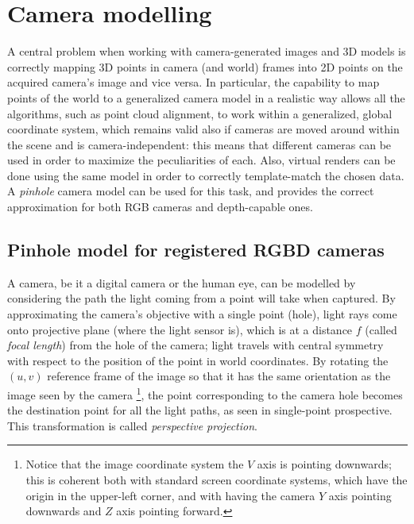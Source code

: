 \section{Camera modelling} \label{sec:camera_modelling}
A central problem when working with camera-generated images and 3D models is
correctly mapping 3D points in camera (and world) frames into 2D points on the
acquired camera's image and vice versa. In particular, the capability to map
points of the world to a generalized camera model in a realistic way allows all
the algorithms, such as point cloud alignment, to work within a generalized,
global coordinate system, which remains valid also if cameras are moved around
within the scene and is camera-independent: this means that different cameras
can be used in order to maximize the peculiarities of each. Also, virtual
renders can be done using the same model in order to correctly template-match
the chosen data.  A \emph{pinhole} camera model can be used for this task, and
provides the correct approximation for both RGB cameras and depth-capable ones.

\subsection{Pinhole model for registered RGBD cameras}\label{sec:intrinsics}
A camera, be it a digital camera or the human eye, can be modelled by
considering the path the light coming from a point will take when
captured. By approximating the camera's objective with a single point (hole),
light rays come onto projective plane (where the light sensor is), which is at a
distance $f$ (called \emph{focal length}) from the hole of the camera; light
travels with central
symmetry with respect to the position of the point in world coordinates. By
rotating the $(u,v)$ reference frame of the image so that it has the same
orientation as the image seen by the camera \footnote{Notice that the image
  coordinate system the $V$ axis is pointing downwards; this is coherent both
  with standard screen coordinate systems, which have the origin in the
  upper-left corner, and with having the camera $Y$ axis pointing downwards and
$Z$ axis pointing forward.}, the point corresponding to the camera hole
becomes the destination point for all the light paths, as seen in single-point
prospective. This transformation is called \emph{perspective projection}.

